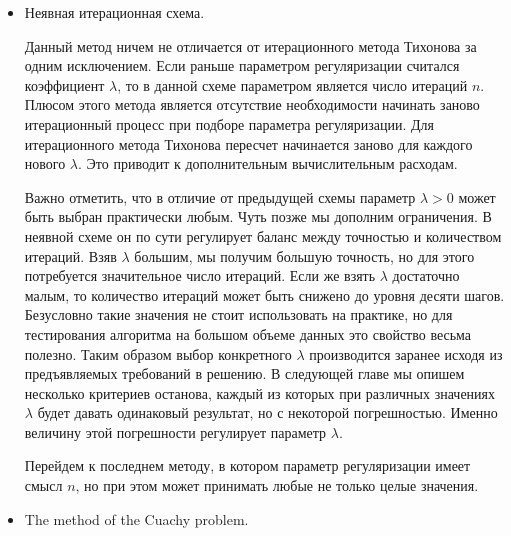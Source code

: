 \documentclass[10pt]{article}
\theoremstyle{definition}
\theoremstyle{remark}
\theoremstyle{plain}
\begin{document}
\begin{itemize}
\item Неявная итерационная схема.

Данный метод ничем не отличается от итерационного метода Тихонова за одним исключением. Если раньше параметром регуляризации считался коэффициент $\lambda$, то в данной схеме параметром является число итераций $n$. Плюсом этого метода является отсутствие необходимости начинать заново итерационный процесс при подборе параметра регуляризации. Для итерационного метода Тихонова пересчет начинается заново для каждого нового $\lambda$. Это приводит к дополнительным вычислительным расходам. 

Важно отметить, что в отличие от предыдущей схемы параметр $\lambda>0$ может быть выбран практически любым. Чуть позже мы дополним ограничения. В неявной схеме он по сути регулирует баланс между точностью и количеством итераций. Взяв $\lambda$  большим, мы получим большую точность, но для этого потребуется значительное число итераций. Если же взять $\lambda$ достаточно малым, то количество итераций может быть снижено до уровня десяти шагов. Безусловно такие значения не стоит использовать на практике, но для тестирования алгоритма на большом объеме данных это свойство весьма полезно. Таким образом выбор конкретного $\lambda$ производится заранее исходя из предъявляемых требований в решению. В следующей главе мы опишем несколько критериев останова, каждый из которых при различных значениях $\lambda$ будет давать одинаковый результат, но с некоторой погрешностью. Именно величину этой погрешности регулирует параметр $\lambda$.

Перейдем к последнем методу, в котором параметр регуляризации имеет смысл $n$, но при этом может принимать любые  не только целые значения.

\item The method of the Cuachy problem.


\end{itemize}
\end{document}

